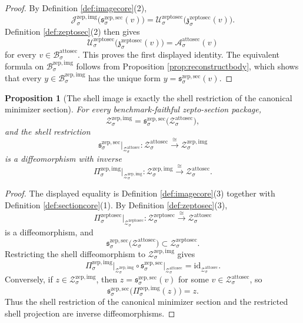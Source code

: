 \documentclass[11pt]{article}
\newcommand{\AttoSectionBody}[1]{\mathcal B_{#1}^{\mathrm{attosec}}}
\newcommand{\AttoSectionFunctional}[1]{\mathscr A_{#1}^{\mathrm{attosec}}}
\newcommand{\AttoSectionShell}[1]{\mathcal Z_{#1}^{\mathrm{attosec}}}
\newcommand{\ZeptoSectionProj}[1]{\Pi_{#1}^{\mathrm{zeptosec}}}
\newcommand{\ZeptoSectionAttoMin}[1]{\mathfrak z_{#1}^{\mathrm{zeptosec}}}
\newcommand{\ZeptoSectionFunctional}[1]{\mathscr U_{#1}^{\mathrm{zeptosec}}}
\newcommand{\ZeptoSectionShell}[1]{\mathcal Z_{#1}^{\mathrm{zeptosec}}}
\newcommand{\ZeptoImgBody}[1]{\mathcal B_{#1}^{\mathrm{zep,img}}}
\newcommand{\ZeptoImgProj}[1]{\Pi_{#1}^{\mathrm{zep,img}}}
\newcommand{\ZeptoImgFunctional}[1]{\mathscr J_{#1}^{\mathrm{zep,img}}}
\newcommand{\ZeptoImgShell}[1]{\mathcal Z_{#1}^{\mathrm{zep,img}}}
\newcommand{\ZeptoMinSection}[1]{\mathfrak s_{#1}^{\mathrm{zep,sec}}}
\newtheorem{proposition}{Proposition}
\begin{document}
\begin{proof}
By Definition \ref{def:imagecore}(2),
\[
\ZeptoImgFunctional{\sigma}\bigl(\ZeptoMinSection{\sigma}(v)\bigr)
=
\ZeptoSectionFunctional{\sigma}\bigl(\ZeptoSectionAttoMin{\sigma}(v)\bigr).
\]
Definition \ref{def:zeptosec}(2) then gives
\[
\ZeptoSectionFunctional{\sigma}\bigl(\ZeptoSectionAttoMin{\sigma}(v)\bigr)
=
\AttoSectionFunctional{\sigma}(v)
\]
for every \(v\in\AttoSectionBody{\sigma}\). This proves the first displayed identity. The equivalent formula on \(\ZeptoImgBody{\sigma}\) follows from Proposition \ref{prop:reconstructbody}, which shows that every \(y\in\ZeptoImgBody{\sigma}\) has the unique form \(y=\ZeptoMinSection{\sigma}(v)\).
\end{proof}

\begin{proposition}[The shell image is exactly the shell restriction of the canonical minimizer section]
\label{prop:reconstructshell}
For every benchmark-faithful zepto-section package,
\[
\ZeptoImgShell{\sigma}
=
\ZeptoMinSection{\sigma}\bigl(\AttoSectionShell{\sigma}\bigr),
\]
and the shell restriction
\[
\ZeptoMinSection{\sigma}\big|_{\AttoSectionShell{\sigma}}
:
\AttoSectionShell{\sigma}\xrightarrow{\cong}\ZeptoImgShell{\sigma}
\]
is a diffeomorphism with inverse
\[
\ZeptoImgProj{\sigma}\big|_{\ZeptoImgShell{\sigma}}
:
\ZeptoImgShell{\sigma}\xrightarrow{\cong}\AttoSectionShell{\sigma}.
\]
\end{proposition}

\begin{proof}
The displayed equality is Definition \ref{def:imagecore}(3) together with Definition \ref{def:sectioncore}(1). By Definition \ref{def:zeptosec}(3),
\[
\ZeptoSectionProj{\sigma}\big|_{\ZeptoSectionShell{\sigma}}
:
\ZeptoSectionShell{\sigma}\xrightarrow{\cong}\AttoSectionShell{\sigma}
\]
is a diffeomorphism, and
\[
\ZeptoMinSection{\sigma}\bigl(\AttoSectionShell{\sigma}\bigr)
\subset
\ZeptoSectionShell{\sigma}.
\]
Restricting the shell diffeomorphism to \(\ZeptoImgShell{\sigma}\) gives
\[
\ZeptoImgProj{\sigma}\big|_{\ZeptoImgShell{\sigma}}
\circ
\ZeptoMinSection{\sigma}\big|_{\AttoSectionShell{\sigma}}
=
\mathrm{id}_{\AttoSectionShell{\sigma}}.
\]
Conversely, if \(z\in\ZeptoImgShell{\sigma}\), then \(z=\ZeptoMinSection{\sigma}(v)\) for some \(v\in\AttoSectionShell{\sigma}\), so
\[
\ZeptoMinSection{\sigma}\bigl(\ZeptoImgProj{\sigma}(z)\bigr)
=
z.
\]
Thus the shell restriction of the canonical minimizer section and the restricted shell projection are inverse diffeomorphisms.
\end{proof}
\end{document}
